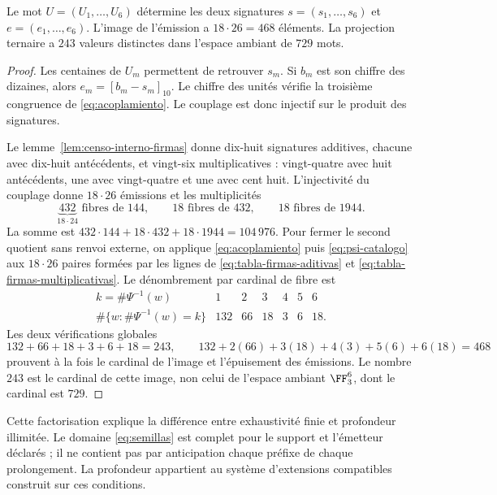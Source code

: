 \begin{proposition}
\label{prop:factorizacion-emision-interna}
Le mot \(U=(U_1,\ldots,U_6)\) détermine les deux signatures \(s=(s_1,\ldots,s_6)\) et \(e=(e_1,\ldots,e_6)\). L’image de l’émission a \(18\cdot26=468\) éléments. La projection ternaire a \(243\) valeurs distinctes dans l’espace ambiant de \(729\) mots.
\end{proposition}
\begin{proof}
Les centaines de \(U_m\) permettent de retrouver \(s_m\). Si \(b_m\) est son chiffre des dizaines, alors \(e_m=[b_m-s_m]_{10}\). Le chiffre des unités vérifie la troisième congruence de \eqref{eq:acoplamiento}. Le couplage est donc injectif sur le produit des signatures.

Le lemme~\ref{lem:censo-interno-firmas} donne dix-huit signatures additives, chacune avec dix-huit antécédents, et vingt-six multiplicatives : vingt-quatre avec huit antécédents, une avec vingt-quatre et une avec cent huit. L'injectivité du couplage donne \(18\cdot26\) émissions et les multiplicités
\[
 \underbrace{432}_{18\cdot24}\text{ fibres de }144,
 \qquad18\text{ fibres de }432,
 \qquad18\text{ fibres de }1944.
\]
La somme est \(432\cdot144+18\cdot432+18\cdot1944=104\,976\). Pour fermer
le second quotient sans renvoi externe, on applique
\eqref{eq:acoplamiento} puis \eqref{eq:psi-catalogo} aux
\(18\cdot26\) paires formées par les lignes de
\eqref{eq:tabla-firmas-aditivas} et
\eqref{eq:tabla-firmas-multiplicativas}. Le dénombrement par cardinal de fibre est
\[
\begin{array}{c|rrrrrr}
k=\#\Psi^{-1}(w)&1&2&3&4&5&6\\ \hline
\#\{w:\#\Psi^{-1}(w)=k\}&132&66&18&3&6&18.
\end{array}
\tag{C}
\label{eq:histograma-proyeccion-ternaria}
\]
Les deux vérifications globales
\[
132+66+18+3+6+18=243,
\qquad
132+2(66)+3(18)+4(3)+5(6)+6(18)=468
\]
prouvent à la fois le cardinal de l’image et l’épuisement des émissions.
Le nombre \(243\) est le cardinal de cette image, non celui de l’espace ambiant
\(\FF_3^6\), dont le cardinal est \(729\).
\end{proof}

Cette factorisation explique la différence entre exhaustivité finie et profondeur illimitée. Le domaine \eqref{eq:semillas} est complet pour le support et l’émetteur déclarés ; il ne contient pas par anticipation chaque préfixe de chaque prolongement. La profondeur appartient au système d’extensions compatibles construit sur ces conditions.

